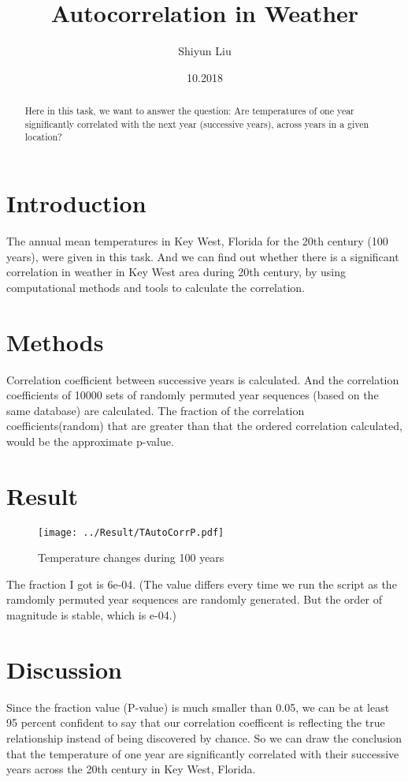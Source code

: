 \documentclass[12pt]{article}
\title{Autocorrelation in Weather}
\author{Shiyun Liu}}
\date{10.2018}
\begin{document}
  \maketitle
  \begin{abstract}
    Here in this task, we want to answer the question:
    Are temperatures of one year significantly correlated with the next year (successive years), across years in a given location?
  \end{abstract}
  \section{Introduction}
    The annual mean temperatures in Key West, Florida for the 20th century (100 years), were given in this task.
    And we can find out whether there is a significant correlation in weather in Key West area during 20th century, by using computational methods and tools to calculate the correlation.
  \section{Methods}
    Correlation coefficient between successive years is calculated.
    And the correlation coefficients of 10000 sets of randomly permuted year sequences (based on the same database) are calculated.
    The fraction of the correlation coefficients(random) that are greater than that the ordered correlation calculated, would be the approximate p-value.
  \section{Result}
  \begin{figure}
	    \centering
	    \texttt{[image: ../Result/TAutoCorrP.pdf]}
	    \caption{Temperature changes during 100 years}
  \end{figure}
    The fraction I got is 6e-04. 
    (The value differs every time we run the script as the ramdomly permuted year sequences are randomly generated.
     But the order of magnitude is stable, which is e-04.)
  \section{Discussion}
    Since the fraction value (P-value) is much smaller than 0.05, we can be at least 95 percent confident to say that our correlation coefficent is reflecting the true relationship instead of being discovered by chance.
    So we can draw the conclusion that the temperature of one year are significantly correlated with their successive years across the 20th century in Key West, Florida.
  
  
\end{document}
